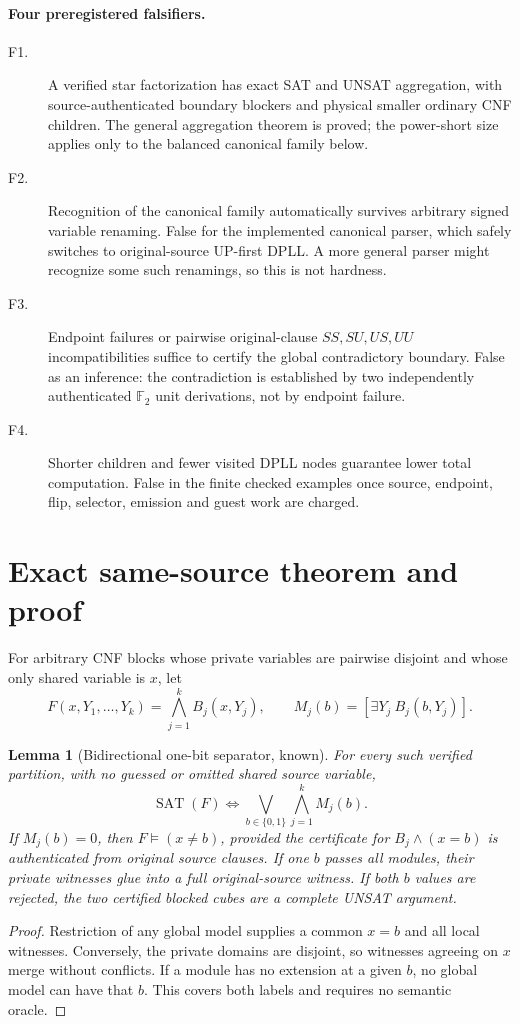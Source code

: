 \documentclass[11pt]{article}
\newtheorem{lemma}{Lemma}
\begin{document}
\paragraph{Four preregistered falsifiers.}
\begin{description}
\item[F1.] A verified star factorization has exact SAT and UNSAT aggregation, with source-authenticated boundary blockers and physical smaller ordinary CNF children. The general aggregation theorem is proved; the power-short size applies only to the balanced canonical family below.
\item[F2.] Recognition of the canonical family automatically survives arbitrary signed variable renaming. False for the implemented canonical parser, which safely switches to original-source UP-first DPLL. A more general parser might recognize some such renamings, so this is not hardness.
\item[F3.] Endpoint failures or pairwise original-clause $SS,SU,US,UU$ incompatibilities suffice to certify the global contradictory boundary. False as an inference: the contradiction is established by two independently authenticated \(\mathbb F_2\) unit derivations, not by endpoint failure.
\item[F4.] Shorter children and fewer visited DPLL nodes guarantee lower total computation. False in the finite checked examples once source, endpoint, flip, selector, emission and guest work are charged.
\end{description}

\section{Exact same-source theorem and proof}
For arbitrary CNF blocks whose private variables are pairwise disjoint and whose only shared variable is $x$, let
\[
F(x,Y_1,\ldots,Y_k)=\bigwedge_{j=1}^{k}B_j(x,Y_j),\qquad
M_j(b)=[\exists Y_j\ B_j(b,Y_j)].
\]
\begin{lemma}[Bidirectional one-bit separator, known]
For every such \emph{verified} partition, with no guessed or omitted shared source variable,
\[
\operatorname{SAT}(F)\iff\bigvee_{b\in\{0,1\}}\bigwedge_{j=1}^{k}M_j(b).
\]
If $M_j(b)=0$, then $F\models(x\ne b)$, provided the certificate for $B_j\land(x=b)$ is authenticated from original source clauses. If one $b$ passes all modules, their private witnesses glue into a full original-source witness. If both $b$ values are rejected, the two certified blocked cubes are a complete UNSAT argument.
\end{lemma}
\begin{proof} Restriction of any global model supplies a common $x=b$ and all local witnesses. Conversely, the private domains are disjoint, so witnesses agreeing on $x$ merge without conflicts. If a module has no extension at a given $b$, no global model can have that $b$. This covers both labels and requires no semantic oracle.\end{proof}
\end{document}
